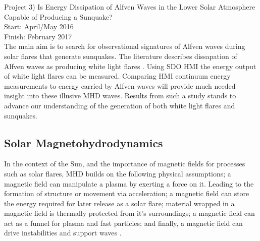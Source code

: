 Project 3) Is Energy Dissipation of Alfven Waves in the Lower Solar Atmosphere Capable of Producing a Sunquake? \\
Start: April/May 2016\\
Finish: February 2017\\

The main aim is to search for observational signatures of Alfven waves during solar flares that generate sunquakes. The literature describes dissapation of Alfven waves as producing white light flares \citep{1982SoPh...80...99E, 2013AGUFMSH51A2091F}. Using SDO HMI the energy output of white light flares can be measured. Comparing HMI continuum energy measurements to energy carried by Alfven waves will provide much needed insight into these illusive MHD waves. Results from such a study stands to advance our understanding of the generation of both white light flares and sunquakes.   

\appendix
\appendixpage
\addappheadtotoc
%





\subsection{Solar Magnetohydrodynamics}\label{MHD}
In the context of the Sun, and the importance of magnetic fields for processes such as solar flares, MHD builds on the following physical assumptions; a magnetic field can manipulate a plasma by exerting a force on it. Leading to the formation of structure or movement via acceleration; a magnetic field can store the energy required for later release as a solar flare; material wrapped in a magnetic field is thermally protected from it's surroundings; a magnetic field can act as a funnel for plasma and fast particles; and finally, a magnetic field can drive instabilities and support waves \citep{2003dysu.book.....D}.
 
